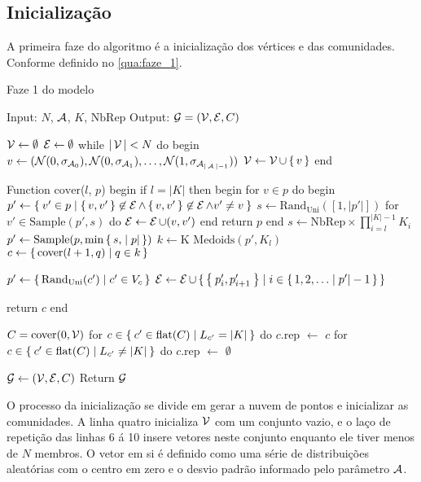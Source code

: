 \documentclass[notes.tex]{subfiles}
\begin{document}
\subsection{Inicialização}

A primeira faze do algoritmo é a inicialização dos vértices e das comunidades.
Conforme definido no \autoref{qua:faze_1}.

\begin{quadro}[htb]
\caption{Faze 1 do modelo}
\label{qua:faze_1}
\begin{algorithm}[escapeinside={/*}{*/}]
Input: $N$, $\operatorname{\mathcal{A}}$, $K$, $\text{NbRep}$
Output: $\operatorname{\mathcal{G}} = (\operatorname{\mathcal{V}}, \operatorname{\mathcal{E}}, C)$

$\operatorname{\mathcal{V}} \leftarrow \emptyset$
$\operatorname{\mathcal{E}} \leftarrow \emptyset$
while $|\operatorname{\mathcal{V}}| < N$ do
begin
    $v \leftarrow (\mathcal{N}(0, \sigma_{\operatorname{\mathcal{A}}_0}), \mathcal{N}(0, \sigma_{\operatorname{\mathcal{A}}_1}), \ldots, \mathcal{N}(1, \sigma_{\operatorname{\mathcal{A}}_{|\operatorname{\mathcal{A}}|-1}}))$
    $\operatorname{\mathcal{V}} \leftarrow \operatorname{\mathcal{V}} \cup \set{v}$
end

Function $\text{cover}$($l$, $p$)
begin
    if $l = |K|$ then
    begin
        for $v \in p$ do
        begin
            $p' \leftarrow \Set{v' \in p | \set{v, v'} \not\in \operatorname{\mathcal{E}}\land \set{v, v'} \not\in \operatorname{\mathcal{E}}\land v' \neq v}$
            $s \leftarrow \text{Rand}_\text{Uni}([1, |p'|])$
            for $v'\in \text{Sample}(p', s)$ do $\operatorname{\mathcal{E}} \leftarrow \operatorname{\mathcal{E}} \cup (v, v')$
        end
        return $p$
    end
    $s \leftarrow \text{NbRep}\times\prod_{i=l}^{|K|-1} K_i$
    $p' \leftarrow \text{Sample}(p, \min\set{s, |p|})$
    $k \leftarrow \text{K Medoids}(p', K_l)$ 
    $c \leftarrow \set{\text{cover}(l+1, q) | q \in k}$

    $p' \leftarrow \set{\text{Rand}_\text{Uni}(c') | c' \in V_c}$
    $\operatorname{\mathcal{E}} \leftarrow \operatorname{\mathcal{E}} \cup \set{\Set{p'_i, p'_{i+1}}| i \in \set{1, 2, \ldots |p'| -1}}$

    return $c$
end

$C = \text{cover}(0, \operatorname{\mathcal{V}})$
for $c \in \Set{c' \in \text{flat}(C) | L_{c'}=|K|}$ do $c$.rep $\leftarrow$ $c$
for $c \in \Set{c' \in \text{flat}(C) | L_{c'}\neq|K|}$ do $c$.rep $\leftarrow$ $\emptyset$

$\operatorname{\mathcal{G}} \leftarrow (\operatorname{\mathcal{V}}, \operatorname{\mathcal{E}}, C)$
Return $\operatorname{\mathcal{G}}$
\end{algorithm}
\end{quadro}

O processo da inicialização se divide em gerar a nuvem de pontos e inicializar as comunidades.
A linha quatro inicializa $\operatorname{\mathcal{V}}$ com um conjunto vazio, e o laço de repetição das linhas 6 á 10 insere vetores neste conjunto enquanto ele tiver menos de  $N$ membros.
O vetor em si é definido como uma série de distribuições aleatórias com o centro em zero e o desvio padrão informado pelo parâmetro $\operatorname{\mathcal{A}}$.
\end{document}
